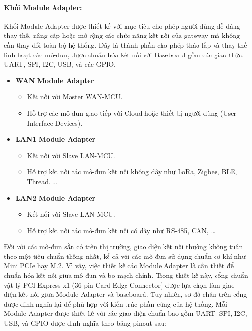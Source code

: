         \paragraph{Khối Module Adapter:}\par
            Khối Module Adapter được thiết kế với mục tiêu cho phép người dùng dễ dàng thay thế, nâng cấp hoặc mở rộng các chức năng kết nối của gateway mà không cần thay đổi toàn bộ hệ thống. Đây là thành phần cho phép tháo lắp và thay thế linh hoạt các mô-đun, được chuẩn hóa kết nối với Baseboard gồm các giao thức: UART, SPI, I2C, USB, và các GPIO.
            \begin{itemize}
                \item \textbf{WAN Module Adapter}
                \begin{itemize}
                    \item Kết nối với Master WAN-MCU.
                    \item Hỗ trợ các mô-đun giao tiếp với Cloud hoặc thiết bị người dùng (User Interface Devices).
                \end{itemize}
                \item \textbf{LAN1 Module Adapter}
                \begin{itemize}
                    \item Kết nối với Slave LAN-MCU.
                    \item Hỗ trợ kết nối các mô-đun kết nối không dây như LoRa, Zigbee, BLE, Thread, \dots
                \end{itemize}
                \item \textbf{LAN2 Module Adapter}
                \begin{itemize}
                    \item Kết nối với Slave LAN-MCU.
                    \item Hỗ trợ kết nối các mô-đun kết nối có dây như RS-485, CAN, \dots
                \end{itemize}
            \end{itemize}
            Đối với các mô-đun sẵn có trên thị trường, giao diện kết nối thường không tuân theo một tiêu chuẩn thống nhất, kể cả với các mô-đun sử dụng chuẩn cơ khí như Mini PCIe hay M.2. Vì vậy, việc thiết kế các Module Adapter là cần thiết để chuẩn hóa kết nối giữa mô-đun và bo mạch chính. Trong thiết kế này, cổng chuẩn vật lý PCI Express x1 (36-pin Card Edge Connector) được lựa chọn làm giao diện kết nối giữa Module Adapter và baseboard. Tuy nhiên, sơ đồ chân trên cổng được định nghĩa lại để phù hợp với kiến trúc phần cứng của hệ thống. Mỗi Module Adapter được thiết kế với các giao diện chuẩn bao gồm UART, SPI, I2C, USB, và GPIO được định nghĩa theo bảng pinout sau:
